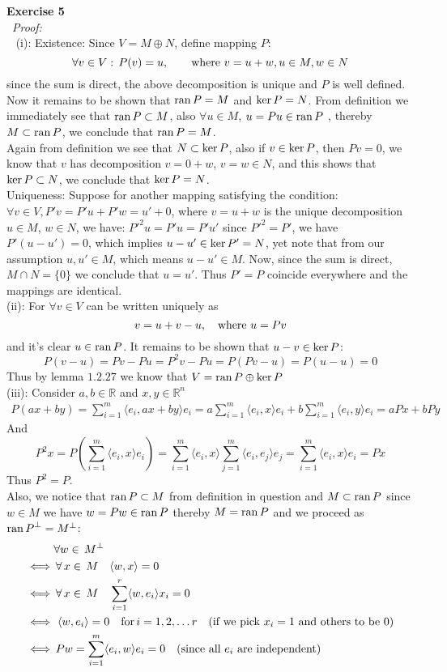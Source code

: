 \documentclass[12pt]{article}
\def\dotp#1#2{\langle#1,#2\rangle}
\def\ss#1#2{\sum_{#1=1}^{#2}}
\def\ep#1#2{{\bf Exercise #1}\\~{\it Proof:}\\~#2\\[1em]}
\def\inn#1#2{(#1): #2\\[0.5em]}
\def\ran#1{{\rm ran}\,#1}
\def\ker#1{{\rm ker}\,#1}
\newcommand{\R}{\mathbb{R}}
\newcommand{\eq}[1]{\begin{align*}#1\end{align*}}
\begin{document}
\ep{5}{
	\inn{i}{
	Existence: Since $V=M\oplus N$, define mapping $P$:
	\[
	\forall v\in V:\, P(v)=u,\qquad \hbox{where } v=u+w, u\in M, w\in N
	\]
	since the sum is direct, the above decomposition is unique and $P$ is well defined.\\
	Now it remains to be shown that $\ran P=M$ and $\ker P=N$. From definition we immediately see
	 that $\ran P\subset M$, also $\forall u\in M$, $u=Pu\in \ran P$ , thereby $ M\subset\ran P$, we conclude that
	 $\ran P=M$.\\
	 Again from definition we see that $N\subset \ker P$, also if $v\in \ker P$, then $Pv=0$, we know that $v$ has decomposition $v=0+w$, $v=w\in N$, and this shows that $\ker P\subset N$, we conclude that $\ker P=N$.\\
	 Uniqueness: Suppose for another mapping satisfying the condition: $\forall v\in V, P'v=P'u+P'w=u'+0$, where $v=u+w$ is the unique decomposition $u\in M$, $w\in N$, we have: $P'^2u=P'u=P'u'$ since $P'^2=P'$, we have $P'(u-u')=0$, which implies $u-u'\in\ker P'=N$, yet note that from our assumption $u,u'\in M$, which means $u-u'\in M$. Now, since the sum is direct, $M\cap N=\{0\}$ we conclude that $u=u'$. Thus $P'=P$ coincide everywhere and the mappings are identical.
	}
	\inn{ii}{
	For $\forall v\in V$ can be written uniquely as
	\[
	v=u+v-u,\quad \hbox{where $u=Pv$}
	\]
	and it's clear $u\in \ran P$. It remains to be shown that $u-v\in \ker P$:
	\[
	P(v-u)=Pv-Pu=P^2v-Pu=P(Pv-u)=P(u-u)=0
	\]
	Thus by lemma $1.2.27$ we know that $V=\ran P\oplus \ker P$ 
	}
	\inn{iii}{
	Consider $a,b\in\R$ and $x,y\in\R^n$
	\eq{
	P(ax+by)=\ss{i}{m}\dotp{e_i}{ax+by}e_i=a\ss{i}{m}\dotp{e_i}{x}e_i+b\ss{i}{m}\dotp{e_i}{y}e_i=aPx+bPy
	}
	And
	\[
	P^2x=P\left(\ss{i}{m}\dotp{e_i}{x}e_i\right)=\ss{i}{m}\dotp{e_i}{x}\ss{j}{m}\dotp{e_i}{e_j}e_j=\ss{i}{m}\dotp{e_i}{x}e_i=Px
	\]
	Thus $P^2=P$.\\
	Also, we notice that $\ran P\subset M$ from definition in question and $M\subset\ran P$ since $w\in M$ we have $w=Pw\in \ran P$ thereby $M=\ran P$  and we proceed as ${\ran P}^{\perp}=M^{\perp}$:
	\eq{
	    &\forall w\in\,{M}^{\perp}\\
	\iff&\,\forall\,x\in\,{M}\quad\dotp{w}{x}=0\\
	\iff&\,\forall\,x\in\,{M}\quad\ss{i}{r} \dotp{w}{e_i}x_i=0\\
	\iff&\,\,\dotp{w}{e_i}=0\quad{\rm for}\,i=1,2,\ldots r\quad\hbox{(if we pick $x_i=1$ and others to be $0$)}\\
	\iff&\,Pw=\ss{i}{m}\dotp{e_i}{w}e_i=0\quad\hbox{(since all $e_i$ are independent)}\\
}}}
\end{document}
